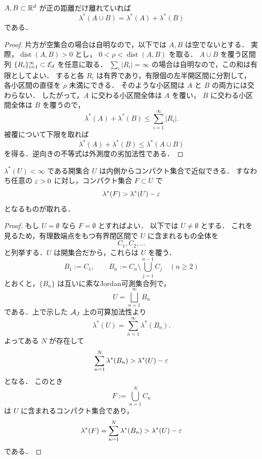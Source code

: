 \begin{lemma} \label{lem:positive-distance-additive}
    $A,B\subset\mathbb R^d$ が正の距離だけ離れていれば
\[
\lambda^*(A\cup B)=\lambda^*(A)+\lambda^*(B)
\]
である．
\end{lemma}

\begin{proof}
片方が空集合の場合は自明なので，以下では $A,B$ は空でないとする．
実際，$\operatorname{dist}(A,B)>0$ とし，
$0<\rho<\operatorname{dist}(A,B)$ を取る．
$A\cup B$ を覆う区間列 $\{R_i\}_{i=1}^{\infty}\subset\mathcal E_d$ を任意に取る．
$\sum_i |R_i|=\infty$ の場合は自明なので，この和は有限としてよい．
すると各 $R_i$ は有界であり，有限個の左半開区間に分割して，
各小区間の直径を $\rho$ 未満にできる．
そのような小区間は $A$ と $B$ の両方には交わらない．
したがって，$A$ に交わる小区間全体は $A$ を覆い，
$B$ に交わる小区間全体は $B$ を覆うので，
\[
\lambda^*(A)+\lambda^*(B)\le \sum_{i=1}^{\infty}|R_i|.
\]
被覆について下限を取れば
\[
\lambda^*(A)+\lambda^*(B)\le \lambda^*(A\cup B)
\]
を得る．逆向きの不等式は外測度の劣加法性である．
\end{proof}

\begin{lemma} \label{lem:finite-open-inner-compact}
    $\lambda^*(U)<\infty$ である開集合 $U$ は内側からコンパクト集合で近似できる．
すなわち任意の $\varepsilon>0$ に対し，コンパクト集合 $F\subset U$ で
\[
\lambda^*(F)>\lambda^*(U)-\varepsilon
\]
となるものが取れる．
\end{lemma}
\begin{proof}
    もし $U=\emptyset$ なら $F=\emptyset$ とすればよい．
以下では $U\neq\emptyset$ とする．
これを見るため，有理数端点をもつ有界閉区間で $U$ に含まれるもの全体を
\[
C_1,C_2,\dots
\]
と列挙する．$U$ は開集合だから，これらは $U$ を覆う．
\[
B_1:=C_1,\qquad
B_n:=C_n\setminus\bigcup_{j=1}^{n-1}C_j\quad(n\ge2)
\]
とおくと，$\{B_n\}$ は互いに素なJordan可測集合列で，
\[
U=\bigsqcup_{n=1}^{\infty}B_n
\]
である．上で示した $\mathcal A_J$ 上の可算加法性より
\[
\lambda^*(U)=\sum_{n=1}^{\infty}\lambda^*(B_n).
\]
よってある $N$ が存在して
\[
\sum_{n=1}^{N}\lambda^*(B_n)>\lambda^*(U)-\varepsilon
\]
となる．
このとき
\[
F:=\bigcup_{n=1}^{N}C_n
\]
は $U$ に含まれるコンパクト集合であり，
\[
\lambda^*(F)
=
\sum_{n=1}^{N}\lambda^*(B_n)
>
\lambda^*(U)-\varepsilon
\]
である．
\end{proof}

